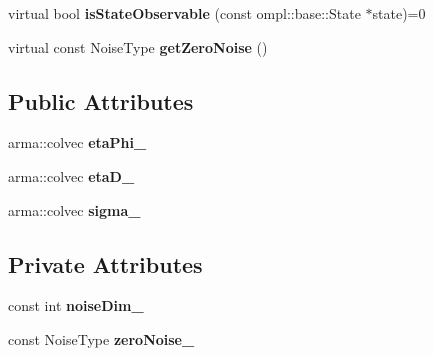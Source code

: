 \begin{DoxyCompactItemize}
\item 
\hypertarget{class_observation_model_method_a351bcd27e192c0cc6f07650c3d9beb70}{virtual bool {\bfseries is\-State\-Observable} (const ompl\-::base\-::\-State $\ast$state)=0}\label{class_observation_model_method_a351bcd27e192c0cc6f07650c3d9beb70}

\item 
\hypertarget{class_observation_model_method_a86809e73a6e01b37f82fe822bd500b7b}{virtual const \-Noise\-Type {\bfseries get\-Zero\-Noise} ()}\label{class_observation_model_method_a86809e73a6e01b37f82fe822bd500b7b}

\end{DoxyCompactItemize}
\subsection*{\-Public \-Attributes}
\begin{DoxyCompactItemize}
\item 
\hypertarget{class_observation_model_method_a183fbeb021b40c30e29239b1c1b895bf}{arma\-::colvec {\bfseries eta\-Phi\-\_\-}}\label{class_observation_model_method_a183fbeb021b40c30e29239b1c1b895bf}

\item 
\hypertarget{class_observation_model_method_a7cd6d5c8235775f6227d3ee5458927db}{arma\-::colvec {\bfseries eta\-D\-\_\-}}\label{class_observation_model_method_a7cd6d5c8235775f6227d3ee5458927db}

\item 
\hypertarget{class_observation_model_method_a126bab071775905203dee38c709444c3}{arma\-::colvec {\bfseries sigma\-\_\-}}\label{class_observation_model_method_a126bab071775905203dee38c709444c3}

\end{DoxyCompactItemize}
\subsection*{\-Private \-Attributes}
\begin{DoxyCompactItemize}
\item 
\hypertarget{class_observation_model_method_adf0334680c9f2f49320c1d584ae9d1b3}{const int {\bfseries noise\-Dim\-\_\-}}\label{class_observation_model_method_adf0334680c9f2f49320c1d584ae9d1b3}

\item 
\hypertarget{class_observation_model_method_a30517a6bfae555908e82880f9d23492c}{const \-Noise\-Type {\bfseries zero\-Noise\-\_\-}}\label{class_observation_model_method_a30517a6bfae555908e82880f9d23492c}

\end{DoxyCompactItemize}


